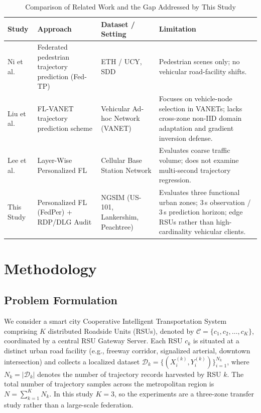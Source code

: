 \documentclass[journal]{IEEEtran}
\begin{document}
\begin{table}[!t]
\centering
\caption{Comparison of Related Work and the Gap Addressed by This Study}
\label{tab:related_work}
\begin{tabular}{@{}p{}p{}p{}p{}@{}}
\toprule
\textbf{Study} & \textbf{Approach} & \textbf{Dataset / Setting} & \textbf{Limitation} \\
\midrule
Ni et al.~\cite{ni2024federated} & Federated pedestrian trajectory prediction (Fed-TP) & ETH / UCY, SDD & Pedestrian scenes only; no vehicular road-facility shifts. \\
Liu et al.~\cite{liu2025trajectory} & FL-VANET trajectory prediction scheme & Vehicular Ad-hoc Network (VANET) & Focuses on vehicle-node selection in VANETs; lacks cross-zone non-IID domain adaptation and gradient inversion defense. \\
Lee et al.~\cite{lee2024layerwise} & Layer-Wise Personalized FL & Cellular Base Station Network & Evaluates coarse traffic volume; does not examine multi-second trajectory regression. \\
This Study & Personalized FL (FedPer) + RDP/DLG Audit & NGSIM (US-101, Lankershim, Peachtree) & Evaluates three functional urban zones; 3\,s observation / 3\,s prediction horizon; edge RSUs rather than high-cardinality vehicular clients. \\
\bottomrule
\end{tabular}
\end{table}

\section{Methodology}
\label{sec:methodology}

\subsection{Problem Formulation}
\label{sec:problem_formulation}
We consider a smart city Cooperative Intelligent Transportation System comprising $K$ distributed Roadside Units (RSUs), denoted by $\mathcal{C} = \{c_1, c_2, \dots, c_K\}$, coordinated by a central RSU Gateway Server. Each RSU $c_k$ is situated at a distinct urban road facility (e.g., freeway corridor, signalized arterial, downtown intersection) and collects a localized dataset $\mathcal{D}_k = \{(X_i^{(k)}, Y_i^{(k)})\}_{i=1}^{N_k}$, where $N_k = |\mathcal{D}_k|$ denotes the number of trajectory records harvested by RSU $k$. The total number of trajectory samples across the metropolitan region is $N = \sum_{k=1}^K N_k$. In this study $K = 3$, so the experiments are a three-zone transfer study rather than a large-scale federation.
\end{document}
